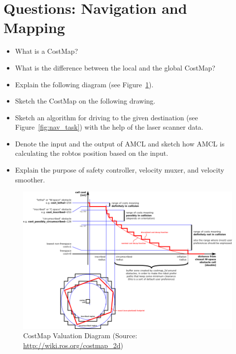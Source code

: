 \section{Questions: Navigation and Mapping}
\label{sec:questions_nav_and_map}

\begin{itemize}
 \item What is a CostMap?
 \item What is the difference between the local and the global CostMap?
 \item Explain the following diagram (see Figure~\ref{fig:costmap}).
 \item Sketch the CostMap on the following drawing.
 \item Sketch an algorithm for driving to the given destination (see Figure~\ref{fig:nav_task}) with the help of the laser scanner data.
 \item Denote the input and the output of AMCL and sketch how AMCL is calculating the robtos position based on the input.
 \item Explain the purpose of safety controller, velocity muxer, and velocity smoother.
\end{itemize}

\begin{figure}[htbp]
 \includegraphics[width=\textwidth]{pic/costmapspec.png}
 \caption{CostMap Valuation Diagram (Source: \href{http://wiki.ros.org/costmap\_2d}{http://wiki.ros.org/costmap\_2d})}
 \label{fig:costmap}
\end{figure}

